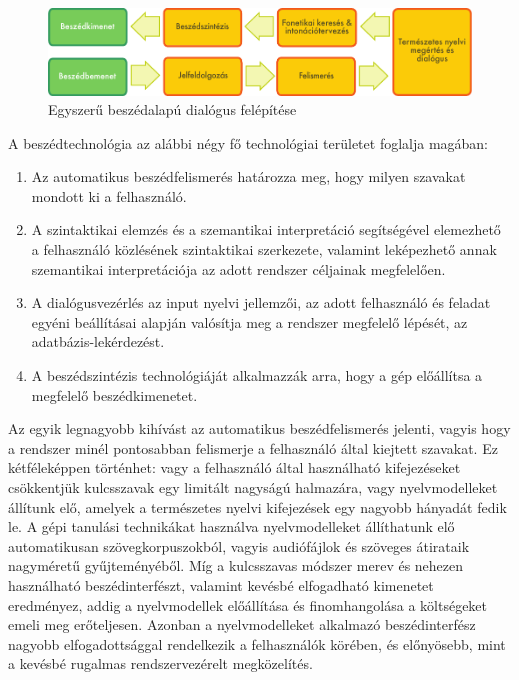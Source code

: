 \begin{multicols}{2}
  \begin{figure}[htb]
    \center 
    \includegraphics[width=\textwidth]{../_media/hungarian/simple_speech-based_dialogue_architecture}
    \caption{Egyszerű beszédalapú dialógus felépítése}
    \label{fig:dialoguearch_de}
  \end{figure}

  A beszédtechnológia az alábbi négy fő technológiai területet foglalja magában:

  \begin{enumerate}
        \item Az automatikus beszédfelismerés határozza meg, hogy milyen szavakat mondott ki a felhasználó.
        \item A szintaktikai elemzés és a szemantikai interpretáció segítségével ele\-mez\-he\-tő a felhasználó közlésének szintaktikai szerkezete, valamint leképezhető annak szemantikai interpretációja az adott rendszer céljainak megfelelően. 
        \item A dialógusvezérlés az input nyelvi jellemzői, az adott felhasználó és feladat egyéni beállításai alapján valósítja meg a rendszer megfelelő lépését, az adatbázis-lekérdezést.     
        \item A beszédszintézis technológiáját alkalmazzák arra, hogy a gép előállítsa a megfelelő beszédkimenetet. 
      \end{enumerate}

  Az egyik legnagyobb kihívást az automatikus beszédfelismerés jelenti, vagyis hogy a rendszer minél pontosabban felismerje a felhasználó által kiejtett szavakat. Ez kétféleképpen történhet: vagy a felhasználó által használható kifejezéseket csökkentjük kulcsszavak egy limitált nagy\-sá\-gú halmazára, vagy nyelvmodelleket állítunk elő, amelyek a természetes nyelvi kifejezések egy nagyobb hányadát fedik le. A gépi tanulási technikákat használva nyelvmodelleket állíthatunk elő auto\-ma\-ti\-ku\-san szövegkorpuszokból, vagyis audiófájlok és szöveges átirataik nagyméretű gyűjteményéből. Míg a kulcsszavas módszer merev és nehezen használható beszédinterfészt, valamint kevésbé elfogadható kimenetet eredményez, addig a nyelv\-mo\-del\-lek előállítása és finomhangolása a költségeket emeli meg erőteljesen. Azonban a nyelvmodelleket alkalmazó beszédinterfész nagyobb elfogadottsággal rendelkezik a felhasználók körében, és előnyösebb, mint a kevésbé rugalmas rendszervezérelt megközelítés. 


\end{multicols}
